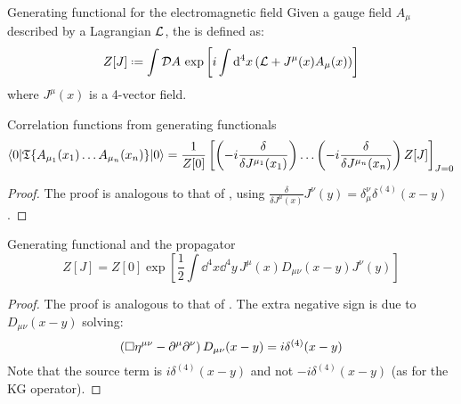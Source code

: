 \begin{definition}{Generating functional for the electromagnetic field}{}
  Given a gauge field $ A_\mu $ described by a Lagrangian $ \mathcal{L} $, the  is defined as:
  \begin{equation}
    Z[J] \defeq \int \mathcal{D}A\, \exp \left[ i \int \dd^4x \left( \lag + J^\mu(x) A_\mu(x) \right) \right]
  \end{equation}
  where $ J^\mu(x) $ is a 4-vector field.
\end{definition}

\begin{lemma}[before upper = {\tcbtitle}]{Correlation functions from generating functionals}{}
  \begin{equation}
    \braket{0 | \mathfrak{T}\{A_{\mu_1}(x_1) \dots A_{\mu_n}(x_n)\} | 0} = \frac{1}{Z[0]} \left[ \left( -i \frac{\delta}{\delta J^{\mu_1}(x_1)} \right) \dots \left( -i \frac{\delta}{\delta J^{\mu_n}(x_n)} \right) Z[J] \right]_{J = 0}
  \end{equation}
\end{lemma}

\begin{proofbox}
  \begin{proof}
    The proof is analogous to that of , using $ \frac{\delta}{\delta J^\mu(x)} J^\nu(y) = \delta^\nu_\mu \delta^{(4)}(x-y) $.
  \end{proof}
\end{proofbox}

\begin{proposition}[before upper = {\tcbtitle}]{Generating functional and the propagator}{}
  \begin{equation}
    Z[J] = Z[0] \exp \left[ \frac{1}{2} \int \dd^4x \dd^4y\, J^\mu(x) D_{\mu \nu}(x-y) J^\nu(y) \right]
  \end{equation}
\end{proposition}

\begin{proofbox}
  \begin{proof}
    The proof is analogous to that of . The extra negative sign is due to $ D_{\mu \nu}(x-y) $ solving:
    \begin{equation}
      \left( \Box \eta^{\mu \nu} - \partial^\mu \partial^\nu \right) D_{\mu \nu}(x-y) = i \delta^{(4)}(x-y)
    \end{equation}
    Note that the source term is $ i \delta^{(4)}(x-y) $ and not $ -i \delta^{(4)}(x-y) $ (as for the KG operator).
  \end{proof}
\end{proofbox}

